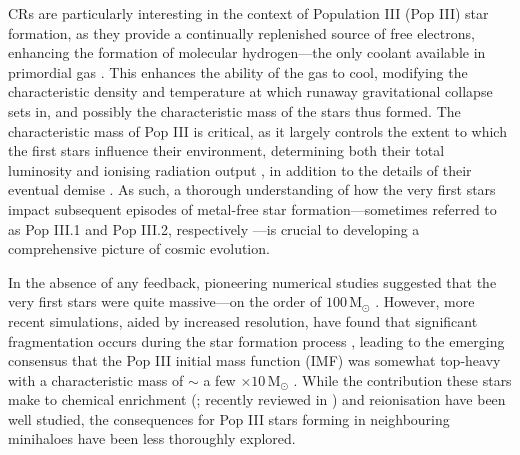 \documentclass{thesis}
\newcommand{\msun}{\ensuremath{\,\mathrm{M}_{\odot}}\xspace}
\begin{document}
CRs are particularly interesting in the context of Population III (Pop III) star formation, as they provide a continually replenished source of free electrons, enhancing the formation of molecular hydrogen---the only coolant available in primordial gas \citep{Abeletal1997,GalliPalla1998,BrommCoppiLarson2002}.  
This enhances the ability of the gas to cool, modifying the characteristic density and temperature at which runaway gravitational collapse sets in, and possibly the characteristic mass of the stars thus formed.   
The characteristic mass of Pop III is critical, as it largely controls the extent to which the first stars influence their environment, determining both their total luminosity and ionising radiation output \citep{Schaerer2002}, in addition to the details of their eventual demise \citep{Hegeretal2003,HegerWoosley2010,MaederMeynet2012}. 
As such, a thorough understanding of how the very first stars impact subsequent episodes of metal-free star formation---sometimes referred to as Pop III.1 and Pop III.2, respectively \citep{McKeeTan2008}---is crucial to developing a comprehensive picture of cosmic evolution.

In the absence of any feedback, pioneering numerical studies suggested that the very first stars were quite massive---on the order of $100\msun$ \citep[e.g.,][]{BrommCoppiLarson1999,BrommCoppiLarson2002,AbelBryanNorman2002,Yoshidaetal2003,BrommLarson2004,Yoshidaetal2006,OSheaNorman2007}. 
However, more recent simulations, aided by increased resolution, have found that significant fragmentation occurs during the star formation process \citep{StacyGreifBromm2010,Clarketal2011a,Clarketal2011b,Greifetal2011,Greifetal2012,StacyBromm2013,Hiranoetal2014,Hosokawaetal2015}, leading to the emerging consensus that the Pop III initial mass function (IMF) was somewhat top-heavy with a characteristic mass of $\sim$ a few $\times 10\msun$ \citep{Bromm2013}. 
While the contribution these stars make to chemical enrichment (\citealt{MadauFerraraRees2001,MoriFerraraMadau2002,BrommYoshidaHernquist2003,Hegeretal2003,UmedaNomoto2003,TornatoreFerraraSchneider2007,Greifetal2007,Greifetal2010,WiseAbel2008,Maioetal2011}; recently reviewed in \citealt{KarlssonBrommHawthorn2013}) and  reionisation \citep{Kitayamaetal2004,Sokasianetal2004,WhalenAbelNorman2004,AlvarezBrommShapiro2006,JohnsonGreifBromm2007,Robertsonetal2010} have been well studied, the consequences for Pop III stars forming in neighbouring minihaloes have been less thoroughly explored.  
\end{document}
